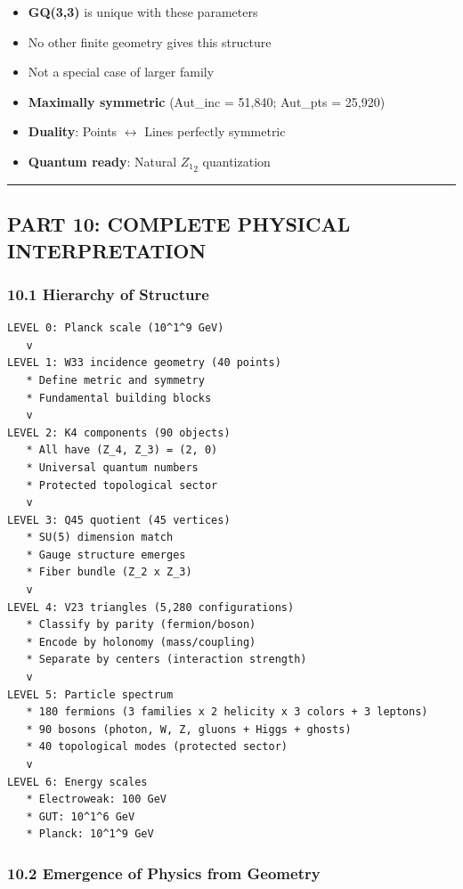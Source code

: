 \documentclass[11pt]{article}
\providecommand{\tightlist}{%
  \setlength{\itemsep}{0pt}\setlength{\parskip}{0pt}}
\begin{document}
\begin{itemize}
\tightlist
\item
  \textbf{GQ(3,3)} is unique with these parameters
\item
  No other finite geometry gives this structure
\item
  Not a special case of larger family
\item
  \textbf{Maximally symmetric} (Aut\_inc = 51,840; Aut\_pts = 25,920)
\item
  \textbf{Duality}: Points \ensuremath{\leftrightarrow} Lines perfectly
  symmetric
\item
  \textbf{Quantum ready}: Natural \(Z₁_{2}\) quantization
\end{itemize}

\begin{center}\rule{0.5\linewidth}{0.5pt}\end{center}

\subsection{PART 10: COMPLETE PHYSICAL
INTERPRETATION}\label{part-10-complete-physical-interpretation}

\subsubsection{10.1 Hierarchy of
Structure}\label{hierarchy-of-structure}

\begin{verbatim}
LEVEL 0: Planck scale (10^1^9 GeV)
   v
LEVEL 1: W33 incidence geometry (40 points)
   * Define metric and symmetry
   * Fundamental building blocks
   v
LEVEL 2: K4 components (90 objects)
   * All have (Z_4, Z_3) = (2, 0)
   * Universal quantum numbers
   * Protected topological sector
   v
LEVEL 3: Q45 quotient (45 vertices)
   * SU(5) dimension match
   * Gauge structure emerges
   * Fiber bundle (Z_2 x Z_3)
   v
LEVEL 4: V23 triangles (5,280 configurations)
   * Classify by parity (fermion/boson)
   * Encode by holonomy (mass/coupling)
   * Separate by centers (interaction strength)
   v
LEVEL 5: Particle spectrum
   * 180 fermions (3 families x 2 helicity x 3 colors + 3 leptons)
   * 90 bosons (photon, W, Z, gluons + Higgs + ghosts)
   * 40 topological modes (protected sector)
   v
LEVEL 6: Energy scales
   * Electroweak: 100 GeV
   * GUT: 10^1^6 GeV
   * Planck: 10^1^9 GeV
\end{verbatim}

\subsubsection{10.2 Emergence of Physics from
Geometry}\label{emergence-of-physics-from-geometry}
\end{document}
